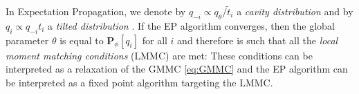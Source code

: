 In Expectation Propagation, we denote by $q_{-i}\propto q_{\theta}/\tilde t_{i}$ a \emph{cavity distribution} and by $q_{i}\propto q_{-i}t_{i}$ a \emph{tilted distribution} \citep{gelman14}. If the EP algorithm converges, then the global parameter $\theta$ is equal to $\mathbf P_\phi[q_i]$ for all $i$ and therefore is such that all the \emph{local moment matching conditions} (LMMC) are met:
%
%
These conditions can be interpreted as a relaxation of the GMMC \eqref{eq:GMMC} and the EP algorithm can be interpreted as a fixed point algorithm targeting the LMMC.
